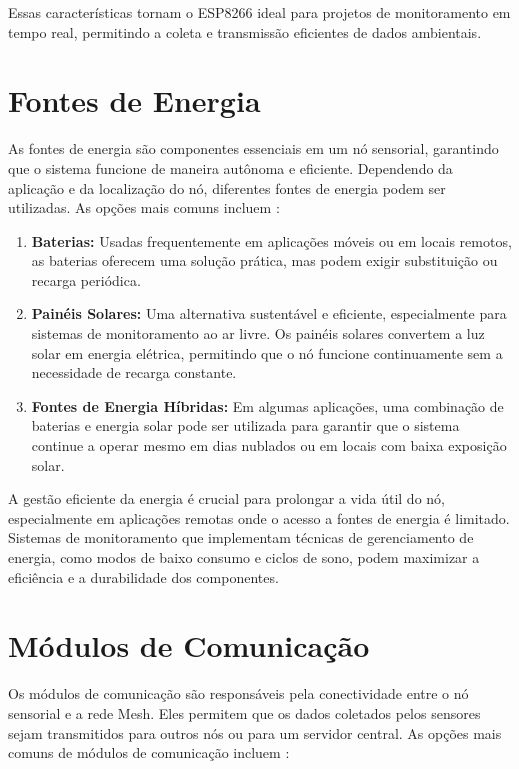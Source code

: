 Essas características tornam o ESP8266 ideal para projetos de monitoramento em tempo real, permitindo a coleta e transmissão eficientes de dados ambientais.

\section{Fontes de Energia}

As fontes de energia são componentes essenciais em um nó sensorial, garantindo que o sistema funcione de maneira autônoma e eficiente. Dependendo da aplicação e da localização do nó, diferentes fontes de energia podem ser utilizadas. As opções mais comuns incluem \cite{espressif_esp8266}:

\begin{enumerate} 
    \item \textbf{Baterias:} Usadas frequentemente em aplicações móveis ou em locais remotos, as baterias oferecem uma solução prática, mas podem exigir substituição ou recarga periódica. 
    \item \textbf{Painéis Solares:} Uma alternativa sustentável e eficiente, especialmente para sistemas de monitoramento ao ar livre. Os painéis solares convertem a luz solar em energia elétrica, permitindo que o nó funcione continuamente sem a necessidade de recarga constante. 
    \item \textbf{Fontes de Energia Híbridas:} Em algumas aplicações, uma combinação de baterias e energia solar pode ser utilizada para garantir que o sistema continue a operar mesmo em dias nublados ou em locais com baixa exposição solar. 
\end{enumerate}

A gestão eficiente da energia é crucial para prolongar a vida útil do nó, especialmente em aplicações remotas onde o acesso a fontes de energia é limitado. Sistemas de monitoramento que implementam técnicas de gerenciamento de energia, como modos de baixo consumo e ciclos de sono, podem maximizar a eficiência e a durabilidade dos componentes.

\section{Módulos de Comunicação}

Os módulos de comunicação são responsáveis pela conectividade entre o nó sensorial e a rede Mesh. Eles permitem que os dados coletados pelos sensores sejam transmitidos para outros nós ou para um servidor central. As opções mais comuns de módulos de comunicação incluem \cite{espressif_esp8266}:

